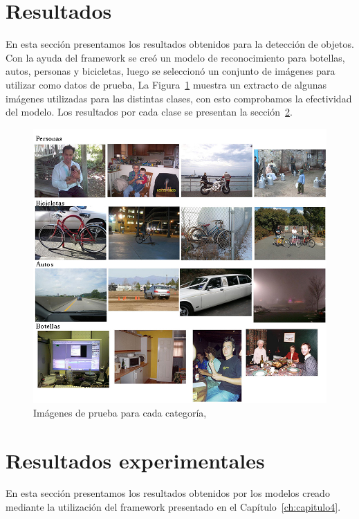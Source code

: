 \section{Resultados}
En esta sección presentamos los resultados obtenidos para la detección de objetos. Con la ayuda del framework se creó un modelo de reconocimiento para botellas, autos, personas y bicicletas, luego se seleccionó un conjunto de imágenes para utilizar como datos de prueba, La Figura~\ref{fig:clases} muestra un extracto de algunas imágenes utilizadas para las distintas clases, con esto comprobamos la efectividad del modelo. Los resultados por cada clase se presentan la sección~\ref{sec:results}.
\begin{figure}[tb]
\centering
 \includegraphics[width=1\textwidth]{Figuras/results/clases.jpg}
 \caption[Imágenes de prueba]{Imágenes de prueba para cada categoría,}
 \label{fig:clases}
\end{figure}
\section{Resultados experimentales}\label{sec:results}
En esta sección presentamos los resultados obtenidos por los modelos creado mediante la utilización del framework presentado en el Capítulo~\ref{ch:capitulo4}.

